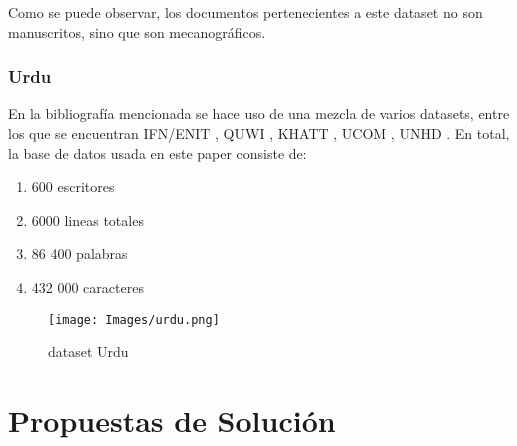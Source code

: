 \documentclass{article}
\begin{document}
Como se puede observar, los documentos pertenecientes a este dataset no son manuscritos, sino que son mecanográficos.


\subsubsection{Urdu}
En la bibliografía mencionada \cite{3} se hace uso de una mezcla de varios datasets, entre los que se encuentran IFN/ENIT \cite{12}, QUWI \cite{13}, KHATT \cite{14}, UCOM \cite{15}, UNHD \cite{16}. 
En total, la base de datos usada en este paper consiste de:
\begin{enumerate}
    \item 600 escritores
    \item 6000 lineas totales
    \item 86 400 palabras 
    \item 432 000 caracteres
\end{enumerate}

\begin{figure}[h]
    \centering
    \texttt{[image: Images/urdu.png]}
    \caption{dataset Urdu}
    \label{fig:enter-label}
\end{figure}



\newpage
\section{Propuestas de Solución}
\end{document}

